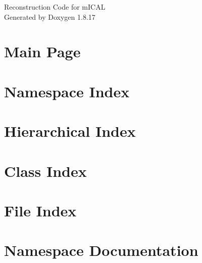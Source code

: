 \let\mypdfximage\pdfximage\def\pdfximage{\immediate\mypdfximage}\documentclass[twoside]{book}
\newcommand{\+}{\discretionary{\mbox{\scriptsize$\hookleftarrow$}}{}{}}
\newcommand{\clearemptydoublepage}{%
  \newpage{\pagestyle{empty}\cleardoublepage}%
}
\begin{document}
\hypersetup{pageanchor=false,
             bookmarksnumbered=true,
             pdfencoding=unicode
            }
\begin{titlepage}
\vspace*{7cm}
\begin{center}%
{\Large Reconstruction Code for m\+I\+C\+AL }\\
\vspace*{1cm}
{\large Generated by Doxygen 1.8.17}\\
\end{center}
\end{titlepage}
\clearemptydoublepage
{}
\tableofcontents
\clearemptydoublepage
{}
\hypersetup{pageanchor=true}

\chapter{Main Page}
\label{index}\hypertarget{index}{}
\chapter{Namespace Index}

\chapter{Hierarchical Index}

\chapter{Class Index}

\chapter{File Index}

\chapter{Namespace Documentation}


\end{document}
